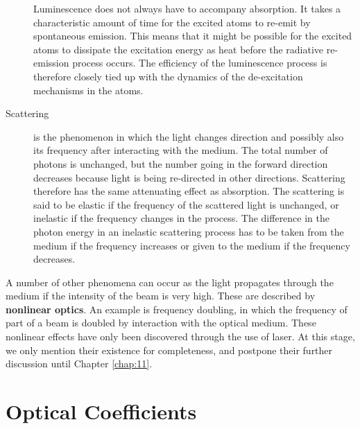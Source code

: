 \documentclass[12pt]{book}
\begin{document}
\begin{description}
Luminescence does not always have to accompany absorption. It takes a characteristic amount of time for the excited atoms to re-emit by spontaneous emission. This means that it might be possible for the excited atoms to dissipate the excitation energy as heat before the radiative re-emission process occurs. The efficiency of the luminescence process is therefore closely tied up with the dynamics of the de-excitation mechanisms in the atoms.

\item[Scattering] is the phenomenon in which the light changes direction and possibly also its frequency after interacting with the medium. The total number of photons is unchanged, but the number going in the forward direction decreases because light is being re-directed in other directions. Scattering therefore has the same attenuating effect as absorption. The scattering is said to be elastic if the frequency of the scattered light is unchanged, or inelastic if the frequency changes in the process. The difference in the photon energy in an inelastic scattering process has to be taken from the medium if the frequency increases or given to the medium if the frequency decreases.
\end{description}


A number of other phenomena can occur as the light propagates through the medium if the intensity of the beam is very high. These are described by \textbf{nonlinear optics}. An example is frequency doubling, in which the frequency of part of a beam is doubled by interaction with the optical medium. These nonlinear effects have only been discovered through the use of laser. At this stage, we only mention their existence for completeness, and postpone their further discussion until Chapter \ref{chap:11}.

\section{Optical Coefficients}
\end{document}
